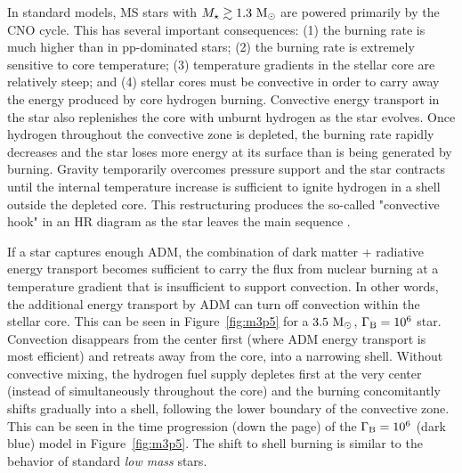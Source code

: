 \documentclass[useAMS,usenatbib]{mnras}
\begin{document}
In standard models, MS stars with $M_{\star} \gtrsim 1.3 \ \mathrm{M}_{\odot}$ 
are powered primarily by the CNO cycle.
This has several important consequences:
(1) the burning rate is much higher than in pp-dominated stars;
(2) the burning rate is extremely sensitive to core temperature; 
(3) temperature gradients in the stellar core are relatively steep; 
and (4) stellar cores must be convective in order 
to carry away the energy produced by core hydrogen burning. 
Convective energy transport in the star also replenishes the 
core with unburnt hydrogen as the star evolves.
Once hydrogen throughout the convective zone is depleted, 
the burning rate rapidly decreases and 
the star loses more energy at its surface than is 
being generated by burning. Gravity temporarily overcomes pressure support and 
the star contracts until the internal temperature increase is sufficient 
to ignite hydrogen in a shell outside the depleted core. This restructuring 
produces the so-called "convective hook" in an HR diagram 
as the star leaves the main sequence \citep{Kippenhahn2012}.

If a star captures enough ADM, the combination of dark matter + radiative energy 
transport becomes sufficient to carry the flux from nuclear burning at a 
temperature gradient that is insufficient to support convection. 
In other words, the additional energy transport by ADM can turn off convection within the stellar core. 
This can be seen in 
Figure~\ref{fig:m3p5} for a $3.5 \ \mathrm{M}_{\odot}$, $\Gamma_\mathrm{B} = 10^{6}$ star. 
Convection disappears from the center first 
(where ADM energy transport is most efficient) 
and retreats away from the core, into a narrowing shell. 
Without convective mixing, the hydrogen fuel supply depletes first 
at the very center (instead of simultaneously throughout the core) and 
the burning concomitantly shifts gradually into a shell, 
following the lower boundary of the convective zone. 
This can be seen in the time progression (down the page) 
of the $\Gamma_\mathrm{B} = 10^{6}$ (dark blue) model in Figure~\ref{fig:m3p5}. 
The shift to shell burning is similar to the behavior of standard {\em low mass} 
stars.
\end{document}

